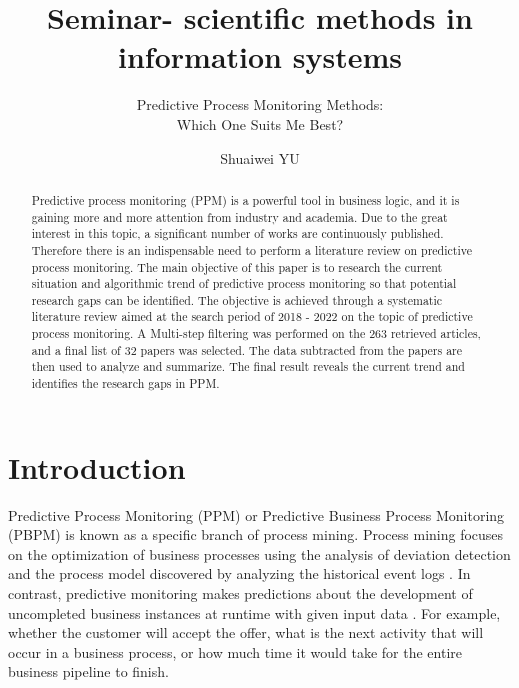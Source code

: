 \documentclass[runningheads]{llncs}
\begin{document}
	\title{Seminar- scientific methods in information systems}
	\subtitle{Predictive Process Monitoring Methods:\\ Which One Suits Me Best?}
	\author{Shuaiwei YU  }
	\maketitle
	
	\begin{abstract}
		Predictive process monitoring (PPM) is a powerful tool in business logic, and it is gaining more and more attention from industry and academia. Due to the great interest in this topic, a significant number of works are continuously published. Therefore there is an indispensable need to perform a literature review on predictive process monitoring. The main objective of this paper is to research the current situation and algorithmic trend of predictive process monitoring so that potential research gaps can be identified. The objective is achieved through a systematic literature review aimed at the search period of 2018 - 2022 on the topic of predictive process monitoring. A Multi-step filtering was performed on the 263 retrieved articles, and a final list of 32 papers was selected. The data subtracted from the papers are then used to analyze and summarize. The final result reveals the current trend and identifies the research gaps in PPM.

	\end{abstract}
	
	\section{Introduction}
		Predictive Process Monitoring (PPM) or Predictive Business Process Monitoring (PBPM) is known as a specific branch of process mining. Process mining focuses on the optimization of business processes using the analysis of deviation detection and the process model discovered by analyzing the historical event logs \cite{art-8}. In contrast, predictive monitoring makes predictions about the development of uncompleted business instances at runtime with given input data \cite{original}. For example, whether the customer will accept the offer, what is the next activity that will occur in a business process, or how much time it would take for the entire business pipeline to finish. 
	
\end{document}
